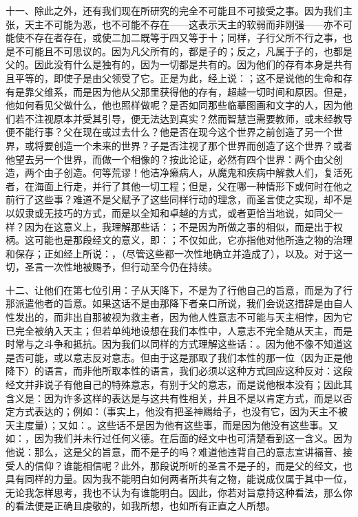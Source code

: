 十一、除此之外，还有我们现在所研究的完全不可能且不可接受之事。因为我们主张，天主不可能为恶，也不可能不存在——这表示天主的软弱而非刚强——亦不可能使不存在者存在，或使二加二既等于四又等于十；同样，子行父所不行之事，也是不可能且不可思议的。因为凡父所有的，都是子的；反之，凡属于子的，也都是父的。因此没有什么是独有的，因为一切都是共有的。因为他们的存有本身是共有且平等的，即使子是由父领受了它。正是为此，经上说：；这不是说他的生命和存有是靠父维系，而是因为他从父那里获得他的存有，超越一切时间和原因。但是，他如何看见父做什么，他也照样做呢？是否如同那些临摹图画和文字的人，因为他们若不注视原本并受其引导，便无法达到真实？然而智慧岂需要教师，或未经教导便不能行事？父在现在或过去什么？他是否在现今这个世界之前创造了另一个世界，或将要创造一个未来的世界？子是否注视了那个世界而创造了这个世界？或者他望去另一个世界，而做一个相像的？按此论证，必然有四个世界：两个由父创造，两个由子创造。何等荒谬！他洁净癞病人，从魔鬼和疾病中解救人们，复活死者，在海面上行走，并行了其他一切工程；但是，父在哪一种情形下或何时在他之前行了这些事？难道不是父赋予了这些同样行动的理念，而圣言使之实现，却不是以奴隶或无技巧的方式，而是以全知和卓越的方式，或者更恰当地说，如同父一样？因为在这意义上，我理解那些话：；不是因为所做之事的相似，而是出于权柄。这可能也是那段经文的意义，即：；不仅如此，它亦指他对他所造之物的治理和保存；正如经上所说：，（尽管这些都一次性地确立并造成了），以及。对于这一切，圣言一次性地被赐予，但行动至今仍在持续。\par

十二、让他们在第七位引用：子从天降下，不是为了行他自己的旨意，而是为了行那派遣他者的旨意。如果这话不是由那降下者亲口所说，我们会说这措辞是由自人性发出的，而非出自那被视为救主者，因为他人性意志不可能与天主相悖，因为它已完全被纳入天主；但若单纯地设想在我们本性中，人意志不完全随从天主，而是时常与之斗争和抵抗。因为我们以同样的方式理解这些话：。因为他不像不知道这是否可能，或以意志反对意志。但由于这是那取了我们本性的那一位（因为正是他降下）的语言，而非他所取本性的语言，我们必须以这种方式回应这种反对：这段经文并非说子有他自己的特殊意志，有别于父的意志，而是说他根本没有；因此其含义是：因为许多这样的表达是与这共有性相关，并且不是以肯定方式，而是以否定方式表达的；例如：（事实上，他没有把圣神赐给子，也没有它，因为天主不被天主度量）；又如：。这些话不是因为他有这些事，而是因为他没有这些事。又如：，因为我们并未行过任何义德。在后面的经文中也可清楚看到这一含义。因为他说：那么，这是父的旨意，而不是子的吗？难道他违背自己的意志宣讲福音、接受人的信仰？谁能相信呢？此外，那段说所听的圣言不是子的，而是父的经文，也具有同样的力量。因为我不能明白如何两者所共有之物，能说成仅属于其中一位，无论我怎样思考，我也不认为有谁能明白。因此，你若对旨意持这种看法，那么你的看法便是正确且虔敬的，如我所想，也如所有正直之人所想。\par

